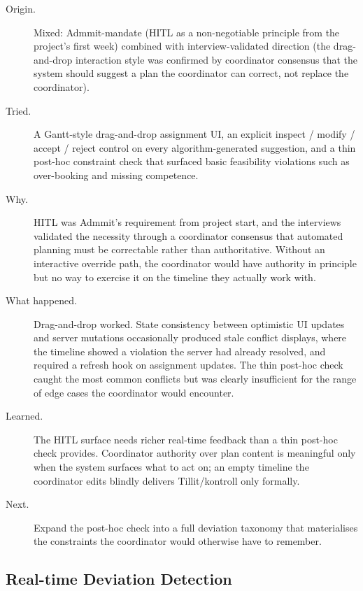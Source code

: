 \begin{description}
  \item[Origin.] Mixed: Admmit-mandate (HITL as a non-negotiable principle from the project's first week) combined with interview-validated direction (the drag-and-drop interaction style was confirmed by coordinator consensus that the system should suggest a plan the coordinator can correct, not replace the coordinator).
  \item[Tried.] A Gantt-style drag-and-drop assignment UI, an explicit inspect / modify / accept / reject control on every algorithm-generated suggestion, and a thin post-hoc constraint check that surfaced basic feasibility violations such as over-booking and missing competence.
  \item[Why.] HITL was Admmit's requirement from project start, and the interviews validated the necessity through a coordinator consensus that automated planning must be correctable rather than authoritative. Without an interactive override path, the coordinator would have authority in principle but no way to exercise it on the timeline they actually work with.
  \item[What happened.] Drag-and-drop worked. State consistency between optimistic UI updates and server mutations occasionally produced stale conflict displays, where the timeline showed a violation the server had already resolved, and required a refresh hook on assignment updates. The thin post-hoc check caught the most common conflicts but was clearly insufficient for the range of edge cases the coordinator would encounter.
  \item[Learned.] The HITL surface needs richer real-time feedback than a thin post-hoc check provides. Coordinator authority over plan content is meaningful only when the system surfaces what to act on; an empty timeline the coordinator edits blindly delivers Tillit/kontroll only formally.
  \item[Next.] Expand the post-hoc check into a full deviation taxonomy that materialises the constraints the coordinator would otherwise have to remember.
\end{description}

\subsection{Real-time Deviation Detection}
\label{sec:iter-deviations}

